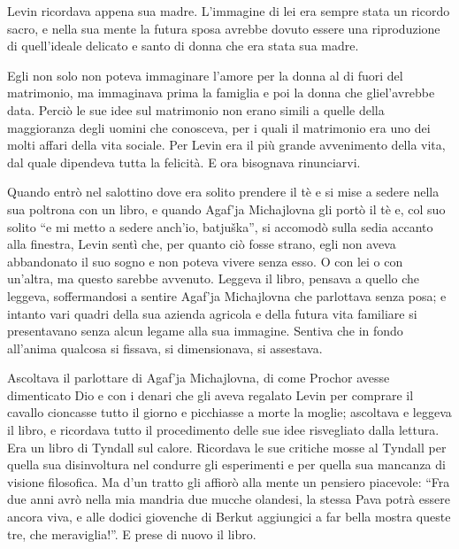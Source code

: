 Levin ricordava appena sua madre. L'immagine di lei era sempre stata un ricordo sacro, e nella sua mente la futura sposa avrebbe dovuto essere una riproduzione di quell'ideale delicato e santo di donna che era stata sua madre. 

Egli non solo non poteva immaginare l'amore per la donna al di fuori del matrimonio, ma immaginava prima la famiglia e poi la donna che gliel'avrebbe data. Perciò le sue idee sul matrimonio non erano simili a quelle della maggioranza degli uomini che conosceva, per i quali il matrimonio era uno dei molti affari della vita sociale. Per Levin era il più grande avvenimento della vita, dal quale dipendeva tutta la felicità. E ora bisognava rinunciarvi. 

Quando entrò nel salottino dove era solito prendere il tè e si mise a sedere nella sua poltrona con un libro, e quando Agaf'ja Michajlovna gli portò il tè e, col suo solito ``e mi metto a sedere anch'io, batjuška'', si accomodò sulla sedia accanto alla finestra, Levin sentì che, per quanto ciò fosse strano, egli non aveva abbandonato il suo sogno e non poteva vivere senza esso. O con lei o con un'altra, ma questo sarebbe avvenuto. Leggeva il libro, pensava a quello che leggeva, soffermandosi a sentire Agaf'ja Michajlovna che parlottava senza posa; e intanto vari quadri della sua azienda agricola e della futura vita familiare si presentavano senza alcun legame alla sua immagine. Sentiva che in fondo all'anima qualcosa si fissava, si dimensionava, si assestava. 

Ascoltava il parlottare di Agaf'ja Michajlovna, di come Prochor avesse dimenticato Dio e con i denari che gli aveva regalato Levin per comprare il cavallo cioncasse tutto il giorno e picchiasse a morte la moglie; ascoltava e leggeva il libro, e ricordava tutto il procedimento delle sue idee risvegliato dalla lettura. Era un libro di Tyndall sul calore. Ricordava le sue critiche mosse al Tyndall per quella sua disinvoltura nel condurre gli esperimenti e per quella sua mancanza di visione filosofica. Ma d'un tratto gli affiorò alla mente un pensiero piacevole: ``Fra due anni avrò nella mia mandria due mucche olandesi, la stessa Pava potrà essere ancora viva, e alle dodici giovenche di Berkut aggiungici a far bella mostra queste tre, che meraviglia!''. E prese di nuovo il libro. 

